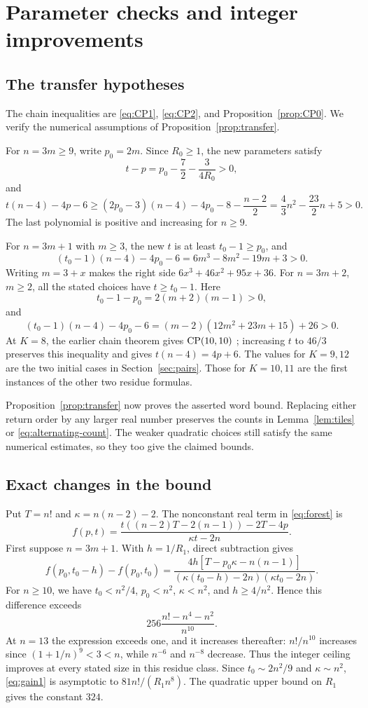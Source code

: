 \section{Parameter checks and integer improvements}\label{app:numerical}

\subsection{The transfer hypotheses}

The chain inequalities are \eqref{eq:CP1}, \eqref{eq:CP2}, and
Proposition~\ref{prop:CP0}. We verify the numerical assumptions of
Proposition~\ref{prop:transfer}.

For $n=3m\ge9$, write $p_0=2m$. Since $R_0\ge1$, the new parameters
satisfy
\[
 t-p=p_0-\frac72-\frac3{4R_0}>0,
\]
and
\[
 t(n-4)-4p-6
 \ge(2p_0-3)(n-4)-4p_0-8-\frac{n-2}{2}
 =\frac43n^2-\frac{23}{2}n+5>0.
\]
The last polynomial is positive and increasing for $n\ge9$.

For $n=3m+1$ with $m\ge3$, the new $t$ is at least $t_0-1\ge p_0$,
and
\[
 (t_0-1)(n-4)-4p_0-6=6m^3-8m^2-19m+3>0.
\]
Writing $m=3+x$ makes the right side
$6x^3+46x^2+95x+36$.
For $n=3m+2$, $m\ge2$, all the stated choices have $t\ge t_0-1$.
Here
\[
 t_0-1-p_0=2(m+2)(m-1)>0,
\]
and
\[
 (t_0-1)(n-4)-4p_0-6
 =(m-2)(12m^2+23m+15)+26>0.
\]
At $K=8$, the earlier chain theorem gives $\operatorname{CP}(10,10)$
\cite{pantone-framework}; increasing $t$ to $46/3$ preserves this
inequality and gives $t(n-4)=4p+6$. The values for $K=9,12$ are the
two initial cases in Section~\ref{sec:pairs}. Those for $K=10,11$
are the first instances of the other two residue formulas.

Proposition~\ref{prop:transfer} now proves the asserted word bound.
Replacing either return order by any larger real number preserves the
counts in Lemma~\ref{lem:tiles} or \eqref{eq:alternating-count}.
The weaker quadratic choices still satisfy the same numerical
estimates, so they too give the claimed bounds.

\subsection{Exact changes in the bound}

Put $T=n!$ and $\kappa=n(n-2)-2$. The nonconstant real term in
\eqref{eq:forest} is
\[
 f(p,t)=\frac{t((n-2)T-2(n-1))-2T-4p}{\kappa t-2n}.
\]
First suppose $n=3m+1$. With $h=1/R_1$, direct subtraction gives
\begin{equation}\label{eq:gain1}
 f(p_0,t_0-h)-f(p_0,t_0)
 =\frac{4h[T-p_0\kappa-n(n-1)]}
 {(\kappa(t_0-h)-2n)(\kappa t_0-2n)}.
\end{equation}
For $n\ge10$, we have $t_0<n^2/4$, $p_0<n^2$,
$\kappa<n^2$, and $h\ge4/n^2$. Hence this difference exceeds
\[
 256\frac{n!-n^4-n^2}{n^{10}}.
\]
At $n=13$ the expression exceeds one, and it increases thereafter:
$n!/n^{10}$ increases since $(1+1/n)^9<3<n$, while
$n^{-6}$ and $n^{-8}$ decrease. Thus the integer ceiling improves
at every stated size in this residue class. Since
$t_0\sim2n^2/9$ and $\kappa\sim n^2$, \eqref{eq:gain1} is
asymptotic to $81n!/(R_1n^8)$. The quadratic upper bound on $R_1$
gives the constant $324$.

